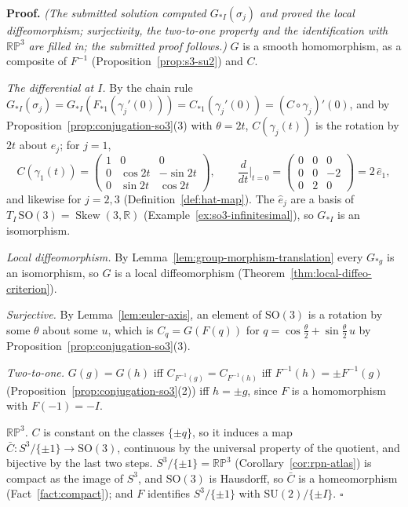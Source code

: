 \documentclass[11pt]{report}
\renewenvironment{proof}[1][Proof]{\noindent\textbf{#1.} }{\hfill$\square$\par\vspace{5pt}}
\newcommand{\SO}{\mathrm{SO}}
\DeclareMathOperator{\Skew}{Skew}
\begin{document}
\begin{proof}
\textit{(The submitted solution computed $G_{*I}(\sigma_j)$ and proved the local diffeomorphism; surjectivity, the two-to-one property and the identification with $\mathbb{RP}^3$ are filled in; the submitted proof follows.)} $G$ is a smooth homomorphism, as a composite of $F^{-1}$ (Proposition~\ref{prop:s3-su2}) and $C$.

\emph{The differential at $I$.} By the chain rule $G_{*I}(\sigma_j) = G_{*I}(F_{*1}(\gamma_j'(0))) = C_{*1}(\gamma_j'(0)) = (C \circ \gamma_j)'(0)$, and by Proposition~\ref{prop:conjugation-so3}(3) with $\theta = 2t$, $C(\gamma_j(t))$ is the rotation by $2t$ about $e_j$; for $j = 1$,
\[
C(\gamma_1(t)) = \begin{pmatrix} 1 & 0 & 0 \\ 0 & \cos 2t & -\sin 2t \\ 0 & \sin 2t & \cos 2t \end{pmatrix}, \qquad \frac{d}{dt}\Big|_{t=0} = \begin{pmatrix} 0 & 0 & 0 \\ 0 & 0 & -2 \\ 0 & 2 & 0 \end{pmatrix} = 2\,\hat e_1 ,
\]
and likewise for $j = 2, 3$ (Definition~\ref{def:hat-map}). The $\hat e_j$ are a basis of $T_I\,\SO(3) = \Skew(3, \mathbb{R})$ (Example~\ref{ex:so3-infinitesimal}), so $G_{*I}$ is an isomorphism.

\emph{Local diffeomorphism.} By Lemma~\ref{lem:group-morphism-translation} every $G_{*g}$ is an isomorphism, so $G$ is a local diffeomorphism (Theorem~\ref{thm:local-diffeo-criterion}).

\emph{Surjective.} By Lemma~\ref{lem:euler-axis}, an element of $\SO(3)$ is a rotation by some $\theta$ about some $u$, which is $C_q = G(F(q))$ for $q = \cos\frac\theta2 + \sin\frac\theta2\, u$ by Proposition~\ref{prop:conjugation-so3}(3).

\emph{Two-to-one.} $G(g) = G(h)$ iff $C_{F^{-1}(g)} = C_{F^{-1}(h)}$ iff $F^{-1}(h) = \pm F^{-1}(g)$ (Proposition~\ref{prop:conjugation-so3}(2)) iff $h = \pm g$, since $F$ is a homomorphism with $F(-1) = -I$.

\emph{$\mathbb{RP}^3$.} $C$ is constant on the classes $\{\pm q\}$, so it induces a map $\bar C : S^3/\{\pm 1\} \to \SO(3)$, continuous by the universal property of the quotient, and bijective by the last two steps. $S^3/\{\pm 1\} = \mathbb{RP}^3$ (Corollary~\ref{cor:rpn-atlas}) is compact as the image of $S^3$, and $\SO(3)$ is Hausdorff, so $\bar C$ is a homeomorphism (Fact~\ref{fact:compact}); and $F$ identifies $S^3/\{\pm 1\}$ with $\mathrm{SU}(2)/\{\pm I\}$.
\end{proof}
\end{document}
